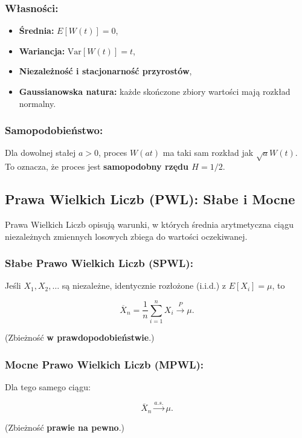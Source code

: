 \subsubsection*{Własności:}

\begin{itemize}
    \item \textbf{Średnia:} $E[W(t)] = 0$,
    \item \textbf{Wariancja:} $\text{Var}[W(t)] = t$,
    \item \textbf{Niezależność i stacjonarność przyrostów},
    \item \textbf{Gaussianowska natura:} każde skończone zbiory wartości mają rozkład normalny.
\end{itemize}

\subsubsection*{Samopodobieństwo:}
Dla dowolnej stałej $a > 0$, proces $W(at)$ ma taki sam rozkład jak $\sqrt{a} W(t)$. To oznacza, że proces jest \textbf{samopodobny rzędu $H = 1/2$}.


\subsection{Prawa Wielkich Liczb (PWL): Słabe i Mocne}
Prawa Wielkich Liczb opisują warunki, w których średnia arytmetyczna ciągu niezależnych zmiennych losowych zbiega do wartości oczekiwanej.

\subsubsection*{Słabe Prawo Wielkich Liczb (SPWL):}

Jeśli $X_1, X_2, \dots$ są niezależne, identycznie rozłożone (i.i.d.) z $E[X_i] = \mu$, to

$$
\overline{X}_n = \frac{1}{n} \sum_{i=1}^n X_i \xrightarrow{P} \mu.
$$

(Zbieżność \textbf{w prawdopodobieństwie}.)

\subsubsection*{Mocne Prawo Wielkich Liczb (MPWL):}

Dla tego samego ciągu:

$$
\overline{X}_n \xrightarrow{a.s.} \mu.
$$

(Zbieżność \textbf{prawie na pewno}.)

